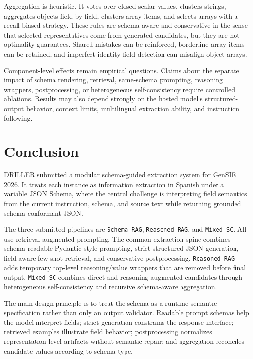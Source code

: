 Aggregation is heuristic. It votes over closed scalar values, clusters strings, aggregates objects field by field, clusters array items, and selects arrays with a recall-biased strategy. These rules are schema-aware and conservative in the sense that selected representatives come from generated candidates, but they are not optimality guarantees. Shared mistakes can be reinforced, borderline array items can be retained, and imperfect identity-field detection can misalign object arrays.

Component-level effects remain empirical questions. Claims about the separate impact of schema rendering, retrieval, same-schema prompting, reasoning wrappers, postprocessing, or heterogeneous self-consistency require controlled ablations. Results may also depend strongly on the hosted model's structured-output behavior, context limits, multilingual extraction ability, and instruction following.

\section{Conclusion}

DRILLER submitted a modular schema-guided extraction system for GenSIE 2026. It treats each instance as information extraction in Spanish under a variable JSON Schema, where the central challenge is interpreting field semantics from the current instruction, schema, and source text while returning grounded schema-conformant JSON.

The three submitted pipelines are \texttt{Schema-RAG}, \texttt{Reasoned-RAG}, and \texttt{Mixed-SC}. All use retrieval-augmented prompting. The common extraction spine combines schema-readable Pydantic-style prompting, strict structured JSON generation, field-aware few-shot retrieval, and conservative postprocessing. \texttt{Reasoned-RAG} adds temporary top-level reasoning/value wrappers that are removed before final output. \texttt{Mixed-SC} combines direct and reasoning-augmented candidates through heterogeneous self-consistency and recursive schema-aware aggregation.

The main design principle is to treat the schema as a runtime semantic specification rather than only an output validator. Readable prompt schemas help the model interpret fields; strict generation constrains the response interface; retrieved examples illustrate field behavior; postprocessing normalizes representation-level artifacts without semantic repair; and aggregation reconciles candidate values according to schema type.

